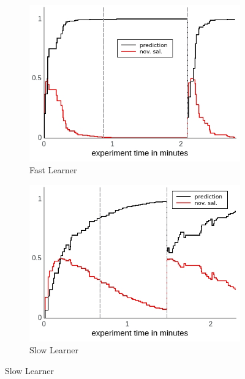 \documentclass[a4paper]{scrreprt}
\begin{document}
\begin{figure}
\centering
    \begin{subfigure}[b]{0.49\textwidth}
        \includegraphics[width=\textwidth]{figs/sec3/fastlearner_mod1.jpeg}
        \caption{Fast Learner}
    \end{subfigure}
\begin{subfigure}[b]{0.49\textwidth}
        \includegraphics[width=\textwidth]{figs/sec3/slowlearner_mod1.jpeg}
        \caption{Slow Learner}
    \end{subfigure}
    

\end{figure}
\end{document}
